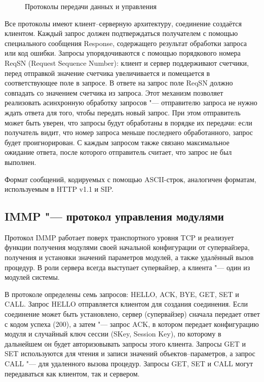 \begin{figure}[ht]
  \caption{Протоколы передачи данных и управления}
  \label{fig:ch5_protocols}
\end{figure}

Все протоколы имеют клиент--серверную архитектуру, соединение создаётся клиентом. Каждый запрос должен подтверждаться получателем с помощью специального сообщения Response, содержащего результат обработки запроса или код ошибки. Запросы упорядочиваются с помощью порядкового номера ReqSN (Request Sequence Number): клиент и сервер поддерживают счетчики, перед отправкой значение счетчика увеличивается и помещается в соответствующее поле в запросе. В ответе на запрос поле ReqSN должно совпадать со значением счетчика из запроса. Этот механизм позволяет реализовать асинхронную обработку запросов "--- отправителю запроса не нужно ждать ответа для того, чтобы передать новый запрос. При этом отправитель может быть уверен, что запросы будут обработаны в порядке их передачи: если получатель видит, что номер запроса меньше последнего обработанного, запрос будет проигнорирован. С каждым запросом также связано максимальное ожидание ответа, после которого отправитель считает, что запрос не был выполнен.

Формат сообщений, кодируемых с помощью ASCII-строк, аналогичен форматам, используемым в HTTP v1.1 и SIP.


\subsection{IMMP "--- протокол управления модулями}\label{sec:ch5_immp}

Протокол IMMP работает поверх транспортного уровня TCP и реализует функции получения модулями своей начальной конфигурации от супервайзера, получения и установки значений параметров модулей, а также удалённый вызов процедур. В роли сервера всегда выступает супервайзер, а клиента "--- один из модулей системы.

В протоколе определены семь запросов: HELLO, ACK, BYE, GET, SET и CALL. Запрос HELLO отправляется клиентом для создания соединения. Если соединение может быть установлено, сервер (супервайзер) сначала передает ответ с кодом успеха (200), а затем "--- запрос ACK, в котором передает конфигурацию модуля и случайный ключ сессии (SKey, Session Key), по которому в дальнейшем он будет авторизовывать запросы этого клиента. Запросы GET и SET используются для чтения и записи значений объектов--параметров, а запрос CALL "--- для удаленного вызова процедур. Запросы GET, SET и CALL могут передаваться как клиентом, так и сервером.

